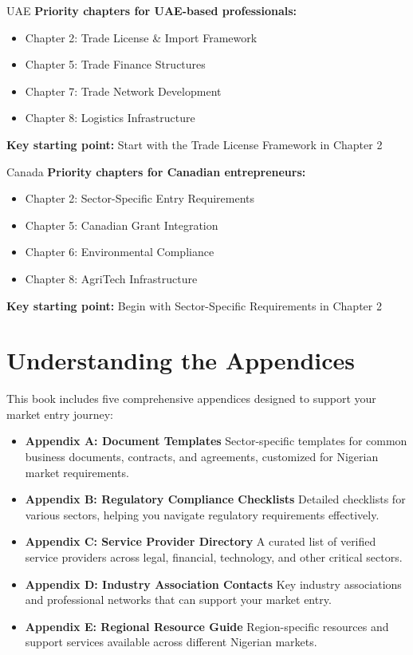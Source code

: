 \begin{regionalbox}{UAE}
\textbf{Priority chapters for UAE-based professionals:}
\begin{itemize}
    \item Chapter 2: Trade License \& Import Framework
    \item Chapter 5: Trade Finance Structures
    \item Chapter 7: Trade Network Development
    \item Chapter 8: Logistics Infrastructure
\end{itemize}

\textbf{Key starting point:} Start with the Trade License Framework in Chapter 2
\end{regionalbox}

\begin{regionalbox}{Canada}
\textbf{Priority chapters for Canadian entrepreneurs:}
\begin{itemize}
    \item Chapter 2: Sector-Specific Entry Requirements
    \item Chapter 5: Canadian Grant Integration
    \item Chapter 6: Environmental Compliance
    \item Chapter 8: AgriTech Infrastructure
\end{itemize}

\textbf{Key starting point:} Begin with Sector-Specific Requirements in Chapter 2
\end{regionalbox}

\section{Understanding the Appendices}\label{sec:understanding-the-appendices}

This book includes five comprehensive appendices designed to support your market entry journey:

\begin{itemize}
    \item \textbf{Appendix A: Document Templates}
    Sector-specific templates for common business documents, contracts, and agreements, customized for Nigerian market requirements.

    \item \textbf{Appendix B: Regulatory Compliance Checklists}
    Detailed checklists for various sectors, helping you navigate regulatory requirements effectively.

    \item \textbf{Appendix C: Service Provider Directory}
    A curated list of verified service providers across legal, financial, technology, and other critical sectors.

    \item \textbf{Appendix D: Industry Association Contacts}
    Key industry associations and professional networks that can support your market entry.

    \item \textbf{Appendix E: Regional Resource Guide}
    Region-specific resources and support services available across different Nigerian markets.
\end{itemize}


